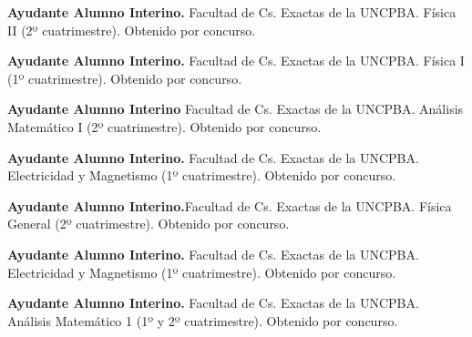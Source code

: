 \textbf{Ayudante Alumno Interino.} Facultad de Cs. Exactas de la UNCPBA. Física II (2º cuatrimestre). Obtenido por concurso.

\textbf{Ayudante Alumno Interino.} Facultad de Cs. Exactas de la UNCPBA. Física I (1º cuatrimestre). Obtenido por concurso.

\textbf{Ayudante Alumno Interino} Facultad de Cs. Exactas de la UNCPBA. Análisis Matemático I (2º cuatrimestre). Obtenido por concurso.

\textbf{Ayudante Alumno Interino.} Facultad de Cs. Exactas de la UNCPBA. Electricidad y Magnetismo (1º cuatrimestre). Obtenido por concurso.

\textbf{Ayudante Alumno Interino.}Facultad de Cs. Exactas de la UNCPBA. Física General (2º cuatrimestre). Obtenido por concurso.

\textbf{Ayudante Alumno Interino.} Facultad de Cs. Exactas de la UNCPBA. Electricidad y Magnetismo (1º cuatrimestre). Obtenido por concurso.

\textbf{Ayudante Alumno Interino.} Facultad de Cs. Exactas de la UNCPBA. Análisis Matemático 1 (1º y 2º cuatrimestre). Obtenido por concurso.